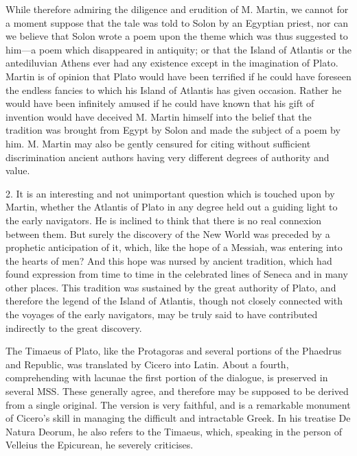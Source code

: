 \documentclass[11pt,letter]{article}
\begin{document}
\par  While therefore admiring the diligence and erudition of M. Martin, we cannot for a moment suppose that the tale was told to Solon by an Egyptian priest, nor can we believe that Solon wrote a poem upon the theme which was thus suggested to him—a poem which disappeared in antiquity; or that the Island of Atlantis or the antediluvian Athens ever had any existence except in the imagination of Plato. Martin is of opinion that Plato would have been terrified if he could have foreseen the endless fancies to which his Island of Atlantis has given occasion. Rather he would have been infinitely amused if he could have known that his gift of invention would have deceived M. Martin himself into the belief that the tradition was brought from Egypt by Solon and made the subject of a poem by him. M. Martin may also be gently censured for citing without sufficient discrimination ancient authors having very different degrees of authority and value.

\par  2. It is an interesting and not unimportant question which is touched upon by Martin, whether the Atlantis of Plato in any degree held out a guiding light to the early navigators. He is inclined to think that there is no real connexion between them. But surely the discovery of the New World was preceded by a prophetic anticipation of it, which, like the hope of a Messiah, was entering into the hearts of men? And this hope was nursed by ancient tradition, which had found expression from time to time in the celebrated lines of Seneca and in many other places. This tradition was sustained by the great authority of Plato, and therefore the legend of the Island of Atlantis, though not closely connected with the voyages of the early navigators, may be truly said to have contributed indirectly to the great discovery.

\par  The Timaeus of Plato, like the Protagoras and several portions of the Phaedrus and Republic, was translated by Cicero into Latin. About a fourth, comprehending with lacunae the first portion of the dialogue, is preserved in several MSS. These generally agree, and therefore may be supposed to be derived from a single original. The version is very faithful, and is a remarkable monument of Cicero’s skill in managing the difficult and intractable Greek. In his treatise De Natura Deorum, he also refers to the Timaeus, which, speaking in the person of Velleius the Epicurean, he severely criticises.
\end{document}

